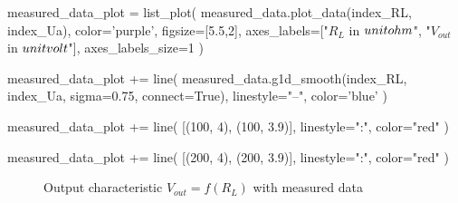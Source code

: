\begin{sagesilent}
    measured_data_plot = list_plot(
        measured_data.plot_data(index_RL, index_Ua),
        color='purple',
        figsize=[5.5,2],
        axes_labels=["$R_L$ in $\\unit{\\ohm}$", "$V_{out}$ in $\\unit{\\volt}$"],
        axes_labels_size=1
    )

    measured_data_plot += line(
        measured_data.g1d_smooth(index_RL, index_Ua, sigma=0.75, connect=True),
        linestyle="--",
        color='blue'
    )

    measured_data_plot += line(
        [(100, 4), (100, 3.9)],
        linestyle=":",
        color="red"
    )

    measured_data_plot += line(
        [(200, 4), (200, 3.9)],
        linestyle=":",
        color="red"
    )
\end{sagesilent}

\begin{figure}[H]
    \centering
    \caption{Output characteristic \textbf{$V_{out} = f(R_L)$} with measured data}
\end{figure}